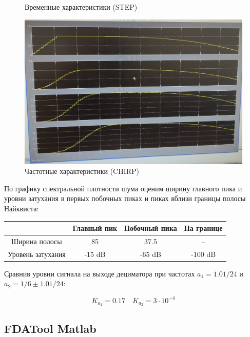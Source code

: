 \documentclass[a4paper, 12pt]{article}%
\begin{document}
\begin{enumerate}
\begin{figure}[h!]
\begin{center}
\begin{minipage}[h!]{0.32\linewidth}
                \caption{Временные характеристики (STEP)}
                \label{3.7_1}
            \end{minipage}
            \hfill
            \begin{minipage}[h!]{0.32\linewidth}
                \includegraphics[width=1\linewidth]{images/3.7_2.jpg}
                \caption{Частотные характеристики (CHIRP)}
                \label{3.7_3}
            \end{minipage}
        \end{center}
    \end{figure}
    
По графику спектральной плотности шума оценим ширину главного пика и уровни затухания в первых побочных пиках и пиках вблизи границы полосы Найквиста:

\begin{center}
\begin{tabular}{|c|c|c|c|}
\hline 
 & Главный пик & Побочный пика & На границе \\ 
\hline 
Ширина полосы & 85 & 37.5 & -- \\ 
\hline 
Уровень затухания & -15 dB & -65 dB & -100 dB \\ 
\hline 
\end{tabular} 
\end{center}

Сравнив уровни сигнала на выходе дециматора при частотах $a_1 = 1.01/24$ и $a_2 = 1/6 \pm 1.01/24$:

\[K_{a_1} = 0.17 \quad K_{a_2} = 3 \cdot 10^{-4}\]
\end{enumerate}

\subsection{FDATool Matlab}
\end{document}
